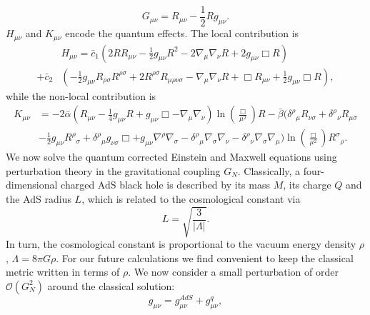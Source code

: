 \documentclass[10pt,a4paper]{article}
\begin{document}
\begin{equation}
    G_{\mu\nu}=R_{\mu\nu}-\frac{1}{2}R g_{\mu\nu}.
\end{equation}
$H_{\mu\nu}$ and $K_{\mu\nu}$ encode the quantum effects. The local contribution is
\begin{equation}
\begin{split}
    &H_{\mu\nu}=\bar{c}_1\left(2R R_{\mu\nu}-\frac{1}{2}g_{\mu\nu}R^2-2\nabla_{\mu}\nabla_{\nu}R+2g_{\mu\nu}\Box R\right)\\
    +\bar{c}_2 &\left(-\frac{1}{2}g_{\mu\nu}R_{\rho\sigma}R^{\rho\sigma}+2R^{\rho\sigma}R_{\mu\rho\nu\sigma}-\nabla_{\mu}\nabla_{\nu}R+\Box R_{\mu\nu}+\frac{1}{2}g_{\mu\nu}\Box R\right),
\end{split}
\end{equation}
while the non-local contribution is
\begin{equation}
\begin{split}
    K_{\mu\nu}&= -2\bar{\alpha}\left(R_{\mu\nu}-\frac{1}{4}g_{\mu\nu}R+g_{\mu\nu}\Box-\nabla_{\mu}\nabla_{\nu}\right)\ln\left(\frac{\Box}{\mu^2}\right)R
    -\bar{\beta}\bigg({\delta^{\rho}}_{\mu}R_{\nu\sigma}+{\delta^{\rho}}_{\nu}R_{\mu\sigma}\\&-\frac{1}{2}g_{\mu\nu}{R^{\rho}}_{\sigma}+{\delta^{\rho}}_{\mu}g_{\nu\sigma}\Box+
   g_{\mu\nu}\nabla^{\rho}\nabla_{\sigma}-{\delta^{\rho}}_{\mu}\nabla_{\sigma}\nabla_{\nu}-{\delta^{\rho}}_{\nu}\nabla_{\sigma}\nabla_{\mu}\bigg)\ln\left(\frac{\Box}{\mu^2}\right){R^{\sigma}}_{\rho}.
\end{split}
\end{equation}
We now solve the quantum corrected Einstein and Maxwell equations using perturbation theory in the gravitational coupling $G_N$. Classically, a four-dimensional charged AdS black hole is described by its mass $M$, its charge $Q$ and the AdS radius $L$, which is related to the cosmological constant via
\begin{equation}
    L=\sqrt{\frac{3}{\vert \Lambda \rvert}}.
\end{equation}
In turn, the cosmological constant is proportional to the vacuum energy density $\rho$,  $\Lambda=8\pi G \rho$. For our future calculations we find convenient to keep the classical metric written in terms of $\rho$.
We now consider a small perturbation of order $\mathcal{O}\left(G^2_N\right)$ around the classical solution:
\begin{equation}\label{eq:expansion}
    g_{\mu\nu}=g^{AdS}_{\mu\nu}+g^{q}_{\mu\nu},
\end{equation}
\end{document}
